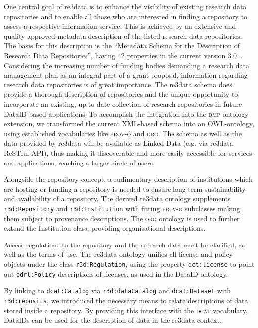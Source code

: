 \documentclass[runningheads,a4paper]{llncs}
\newcommand{\org}{{\scshape org}\xspace}
\newcommand{\prov}{{\scshape prov-o}\xspace}
\newcommand{\dcat}{{\scshape dcat}\xspace}
\newcommand{\dmp}{{\scshape dmp}\xspace}
\newcommand{\prop}[1]{{{\texttt{#1}}}}
\begin{document}
One central goal of re3data is to enhance the visibility of existing research data repositories and to enable all those who are interested in finding a repository to assess a respective information service. This is achieved by an extensive and quality approved metadata description of the listed research data repositories. The basis for this description is the “Metadata Schema for the Description of Research Data Repositories”, having 42 properties in the current version 3.0~\cite{r3dSchema}.
Considering the increasing number of funding bodies demanding a research data management plan as an integral part of a grant proposal, information regarding research data repositories is of great importance.
The re3data schema does provide a thorough description of repositories and the unique opportunity to incorporate an existing, up-to-date collection of research repositories in future DataID-based applications. To accomplish the integration into the \dmp ontology extension, we transformed the current XML-based schema into an OWL-ontology, using established vocabularies like \prov and \org. The schema as well as the data provided by re3data will be available as Linked Data (e.g. via re3data ReSTful-API), thus making it discoverable and more easily accessible for services and applications, reaching a larger circle of users.

Alongside the repository-concept, a rudimentary description of institutions which are hosting or funding a repository is needed to ensure long-term sustainability and availability of a repository. The derived re3data ontology supplements \prop{r3d:Repository} and \prop{r3d:Institution} with fitting \prov subclasses
making them subject to provenance descriptions. The \org ontology is used to further extend the Institution class, providing organisational descriptions.

Access regulations to the repository and the research data must be clarified, as well as the terms of use. The re3data ontology unifies all license and policy objects under the class \prop{r3d:Regulation}, using the property \prop{dct:license} to point out \prop{odrl:Policy} descriptions of licenses, as used in the DataID ontology.

By linking to \prop{dcat:Catalog} via \prop{r3d:dataCatalog} and \prop{dcat:Dataset} with \prop{r3d:reposits}, we introduced the necessary means to relate descriptions of data stored inside a repository. By providing this interface with the \dcat vocabulary, DataIDs can be used for the description of data in the re3data context.
\end{document}
